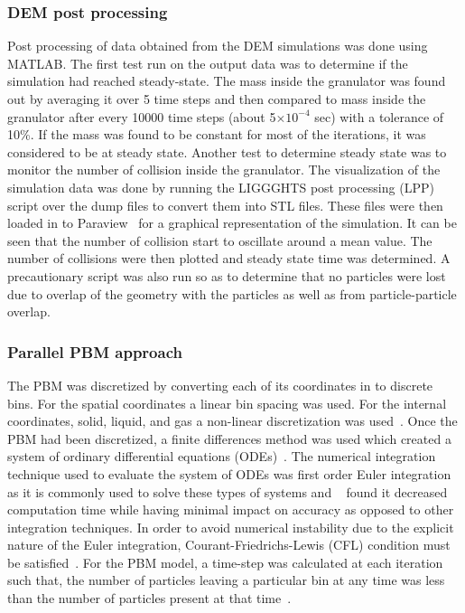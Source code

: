 \documentclass[preprint,11pt,authoryear]{elsarticle}
\begin{document}
\subsubsection{DEM post processing}
Post processing of data obtained from the DEM simulations was done using MATLAB. 
The first test run on the output data was to determine if the simulation had reached steady-state. The 
mass inside the granulator was found out by averaging it over 5 time steps and then compared to 
mass inside the granulator after every 10000 time steps (about 5$\times 10^{-4}$ sec) with a 
tolerance of 10\%. If the mass was found to be constant for most of the iterations, it was 
considered to be at steady state. Another test to determine steady state was to monitor the number of 
collision inside the granulator. The visualization of the simulation data was done by running the 
LIGGGHTS post processing (LPP) script over the dump files to convert them into STL files. These 
files were then loaded in to Paraview~\citep{paraview2017} for a graphical 
representation of the 
simulation. It can be seen that the number of collision start to oscillate around a mean value. The 
number of collisions were then plotted and steady state time was determined.
A precautionary script was also run so as to determine that no particles were lost due to overlap 
of the geometry with the particles as well as from particle-particle overlap.


\subsubsection{Parallel PBM approach}
The PBM was discretized by converting each of its coordinates in to discrete
bins. For the spatial coordinates a linear bin spacing was used. For the
internal coordinates, solid, liquid, and gas a non-linear discretization was
used~\citep{barrasso2012}. Once the PBM had been discretized, a finite
differences method was used which created a system of ordinary differential
equations (ODEs)~\citep{Barrasso2015cerd}. The numerical integration technique
used to evaluate the system of ODEs was first order Euler integration as it is
commonly used to solve these types of systems and ~\citep{Barrasso2013} 
found it decreased computation time while having minimal impact on 
accuracy as opposed to other integration techniques. In
order to avoid numerical instability due to the explicit nature of the Euler
integration, Courant-Friedrichs-Lewis (CFL) condition must be
satisfied~\citep{courant1967}. For the PBM model, a time-step was calculated at
each iteration such that, the number of particles leaving a particular bin at
any time was less than the number of particles present at that
time~\citep{Ramachandran2010}.
\end{document}

